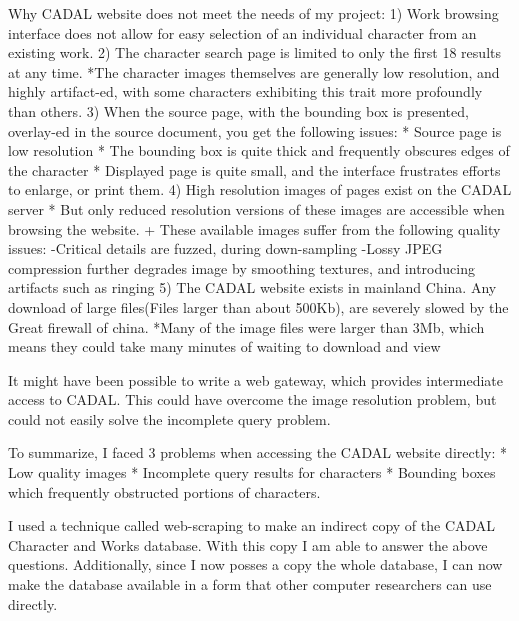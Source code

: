     Why CADAL website does not meet the needs of my project:
        1)  Work browsing interface does not allow for easy selection of an individual character from an existing work.
        2)  The character search page is limited to only the first 18 results at any time.
            *The character images themselves are generally low resolution, and highly artifact-ed, with some characters exhibiting this trait more profoundly than others.
        3)  When the source page, with the bounding box is presented, overlay-ed in the source document, you get the following issues:
            *  Source page is low resolution
            *  The bounding box is quite thick and frequently obscures edges of the character
            *  Displayed page is quite small, and the interface frustrates efforts to enlarge, or print them.
        4)  High resolution images of pages exist on the CADAL server
            * But only reduced resolution versions of these images are accessible when browsing the website.
                + These available images suffer from the following quality issues:
                    -Critical details are fuzzed, during down-sampling
                    -Lossy JPEG compression further degrades image by smoothing textures, and introducing artifacts such as ringing
        5)  The CADAL website exists in mainland China.  Any download of large files(Files larger than about 500Kb), are severely slowed by the Great firewall of china.
            *Many of the image files were larger than 3Mb, which means they could take many minutes of waiting to download and view
        
        
    It might have been possible to write a web gateway, which provides intermediate access to CADAL.  This could have overcome the image resolution problem, but could not easily solve the incomplete query problem.
    
    To summarize, I faced 3 problems when accessing the CADAL website directly:
        *  Low quality images
        *  Incomplete query results for characters
        *  Bounding boxes which frequently obstructed portions of characters.
                    

I used a technique called web-scraping to make an indirect copy of the CADAL Character and Works database.  With this copy I am able to answer the above questions.  Additionally, since I now posses a copy the whole database, I can now make the database available in a form that other computer researchers can use directly.







